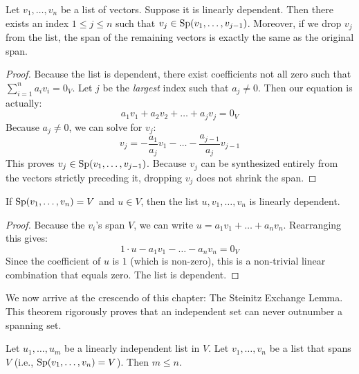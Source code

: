 \begin{lemma}
Let $v_1, \dots, v_n$ be a list of vectors. Suppose it is linearly dependent. Then there exists an index $1 \le j \le n$ such that $v_j \in \operatorname{Sp}(v_1, \dots, v_{j-1})$. Moreover, if we drop $v_j$ from the list, the span of the remaining vectors is exactly the same as the original span.
\end{lemma}

\begin{proof}
Because the list is dependent, there exist coefficients not all zero such that $\sum_{i=1}^n a_i v_i = 0_V$. Let $j$ be the \textit{largest} index such that $a_j \ne 0$. Then our equation is actually:
\[
a_1 v_1 + a_2 v_2 + \dots + a_j v_j = 0_V
\]
Because $a_j \ne 0$, we can solve for $v_j$:
\[
v_j = -\frac{a_1}{a_j} v_1 - \dots - \frac{a_{j-1}}{a_j} v_{j-1}
\]
This proves $v_j \in \operatorname{Sp}(v_1, \dots, v_{j-1})$. Because $v_j$ can be synthesized entirely from the vectors strictly preceding it, dropping $v_j$ does not shrink the span.
\end{proof}

\begin{lemma}
If $\operatorname{Sp}(v_1, \dots, v_n) = V$ and $u \in V$, then the list $u, v_1, \dots, v_n$ is linearly dependent.
\end{lemma}

\begin{proof}
Because the $v_i$'s span $V$, we can write $u = a_1 v_1 + \dots + a_n v_n$. Rearranging this gives:
\[
1 \cdot u - a_1 v_1 - \dots - a_n v_n = 0_V
\]
Since the coefficient of $u$ is $1$ (which is non-zero), this is a non-trivial linear combination that equals zero. The list is dependent.
\end{proof}

We now arrive at the crescendo of this chapter: The Steinitz Exchange Lemma. This theorem rigorously proves that an independent set can never outnumber a spanning set.

\begin{theorem}
Let $u_1, \dots, u_m$ be a linearly independent list in $V$. Let $v_1, \dots, v_n$ be a list that spans $V$ (i.e., $\operatorname{Sp}(v_1, \dots, v_n) = V$). Then $m \le n$.
\end{theorem}

